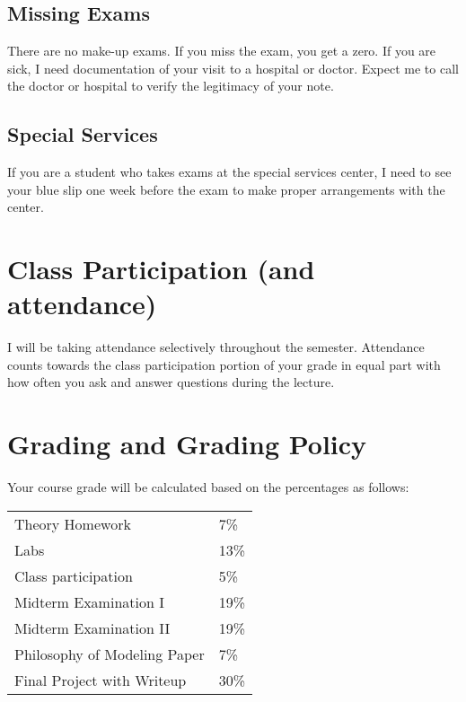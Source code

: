 \documentclass[12pt]{article}
\begin{document}
\subsection*{Missing Exams}

There are no make-up exams. If you miss the exam, you get a zero. If you are sick, I need documentation of your visit to a hospital or doctor. Expect me to call the doctor or hospital to verify the legitimacy of your note. %

\subsection*{Special Services}

If you are a student who takes exams at the special services center, I need to see your blue slip one week before the exam to make proper arrangements with the center.

\section*{Class Participation (and attendance)}

I will be taking attendance selectively throughout the semester. Attendance counts towards the class participation portion of your grade in equal part with how often you ask and answer questions during the lecture.


\section*{Grading and Grading Policy}\label{sec:grading}

Your course grade will be calculated based on the percentages as follows: 

\begin{table}[h]
\centering
\begin{tabular}{l|l}
Theory Homework & 7\% \\
Labs & 13\% \\
Class participation & 5\% \\
Midterm Examination I & 19\%\\
Midterm Examination II & 19\%\\
Philosophy of Modeling Paper & 7\% \\
Final Project with Writeup & 30\%
\end{tabular}
\end{table}
\FloatBarrier
\end{document}
